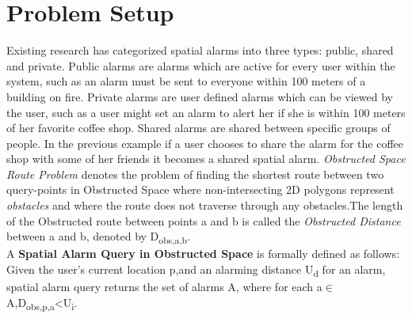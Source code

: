 \documentclass{sig-alternate}
\begin{document}
\section{Problem Setup}
Existing research has categorized spatial alarms into three types: public, shared and private. Public alarms are alarms which are active for every user within the system, such as an alarm must be sent to everyone within 100 meters of a building on fire. Private alarms are user defined alarms which can be viewed by the user, such as a user might set an alarm to alert her if she is within 100 meters of her favorite coffee shop. Shared alarms are shared between specific groups of people. In the previous example if a user chooses to share the alarm for the coffee shop with some of her friends it becomes a shared spatial alarm.
\textit{Obstructed Space Route Problem} denotes the problem of finding the shortest route between two query-points  in Obstructed Space where non-intersecting 2D polygons represent \textit{obstacles} and where the route does not traverse through any obstacles.The length of the Obstructed route between points a and b is called the \textit{Obstructed Distance} between a and b, denoted by D\textsubscript{obs,a,b}.\\
A \textbf{Spatial Alarm Query in Obstructed Space} is formally defined as follows:
Given the user's current location p,and an alarming distance U\textsubscript{d} for an alarm, spatial alarm query returns the set of alarms A, where for each a$\in$ A,D\textsubscript{obs,p,a}<U\textsubscript{i}. 
\end{document}
